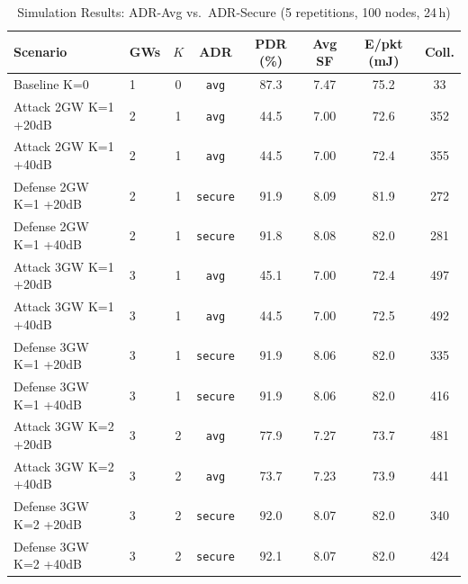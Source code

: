 \begin{table}[t]
\centering
\caption{Simulation Results: ADR-Avg vs.\ ADR-Secure (5 repetitions, 100 nodes, 24\,h)}
\label{tab:results}
\begin{tabular}{llcccccc}
\toprule
Scenario & GWs & $K$ & ADR & PDR (\%) & Avg SF & E/pkt (mJ) & Coll. \\
\midrule
Baseline K=0 & 1 & 0 & \texttt{avg} & 87.3 & 7.47 & 75.2 & 33 \\
Attack 2GW K=1 +20dB & 2 & 1 & \texttt{avg} & 44.5 & 7.00 & 72.6 & 352 \\
Attack 2GW K=1 +40dB & 2 & 1 & \texttt{avg} & 44.5 & 7.00 & 72.4 & 355 \\
Defense 2GW K=1 +20dB & 2 & 1 & \texttt{secure} & 91.9 & 8.09 & 81.9 & 272 \\
Defense 2GW K=1 +40dB & 2 & 1 & \texttt{secure} & 91.8 & 8.08 & 82.0 & 281 \\
Attack 3GW K=1 +20dB & 3 & 1 & \texttt{avg} & 45.1 & 7.00 & 72.4 & 497 \\
Attack 3GW K=1 +40dB & 3 & 1 & \texttt{avg} & 44.5 & 7.00 & 72.5 & 492 \\
Defense 3GW K=1 +20dB & 3 & 1 & \texttt{secure} & 91.9 & 8.06 & 82.0 & 335 \\
Defense 3GW K=1 +40dB & 3 & 1 & \texttt{secure} & 91.9 & 8.06 & 82.0 & 416 \\
Attack 3GW K=2 +20dB & 3 & 2 & \texttt{avg} & 77.9 & 7.27 & 73.7 & 481 \\
Attack 3GW K=2 +40dB & 3 & 2 & \texttt{avg} & 73.7 & 7.23 & 73.9 & 441 \\
Defense 3GW K=2 +20dB & 3 & 2 & \texttt{secure} & 92.0 & 8.07 & 82.0 & 340 \\
Defense 3GW K=2 +40dB & 3 & 2 & \texttt{secure} & 92.1 & 8.07 & 82.0 & 424 \\
\bottomrule
\end{tabular}
\end{table}
